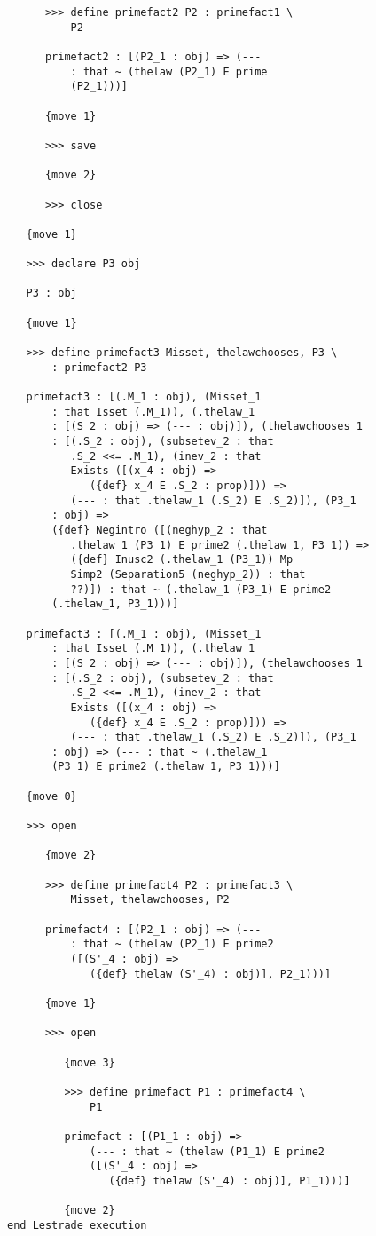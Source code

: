 \documentclass[12pt]{article}
\begin{document}
\begin{verbatim}
      >>> define primefact2 P2 : primefact1 \
          P2

      primefact2 : [(P2_1 : obj) => (--- 
          : that ~ (thelaw (P2_1) E prime 
          (P2_1)))]

      {move 1}

      >>> save

      {move 2}

      >>> close

   {move 1}

   >>> declare P3 obj

   P3 : obj

   {move 1}

   >>> define primefact3 Misset, thelawchooses, P3 \
       : primefact2 P3

   primefact3 : [(.M_1 : obj), (Misset_1 
       : that Isset (.M_1)), (.thelaw_1 
       : [(S_2 : obj) => (--- : obj)]), (thelawchooses_1 
       : [(.S_2 : obj), (subsetev_2 : that 
          .S_2 <<= .M_1), (inev_2 : that 
          Exists ([(x_4 : obj) => 
             ({def} x_4 E .S_2 : prop)])) => 
          (--- : that .thelaw_1 (.S_2) E .S_2)]), (P3_1 
       : obj) => 
       ({def} Negintro ([(neghyp_2 : that 
          .thelaw_1 (P3_1) E prime2 (.thelaw_1, P3_1)) => 
          ({def} Inusc2 (.thelaw_1 (P3_1)) Mp 
          Simp2 (Separation5 (neghyp_2)) : that 
          ??)]) : that ~ (.thelaw_1 (P3_1) E prime2 
       (.thelaw_1, P3_1)))]

   primefact3 : [(.M_1 : obj), (Misset_1 
       : that Isset (.M_1)), (.thelaw_1 
       : [(S_2 : obj) => (--- : obj)]), (thelawchooses_1 
       : [(.S_2 : obj), (subsetev_2 : that 
          .S_2 <<= .M_1), (inev_2 : that 
          Exists ([(x_4 : obj) => 
             ({def} x_4 E .S_2 : prop)])) => 
          (--- : that .thelaw_1 (.S_2) E .S_2)]), (P3_1 
       : obj) => (--- : that ~ (.thelaw_1 
       (P3_1) E prime2 (.thelaw_1, P3_1)))]

   {move 0}

   >>> open

      {move 2}

      >>> define primefact4 P2 : primefact3 \
          Misset, thelawchooses, P2

      primefact4 : [(P2_1 : obj) => (--- 
          : that ~ (thelaw (P2_1) E prime2 
          ([(S'_4 : obj) => 
             ({def} thelaw (S'_4) : obj)], P2_1)))]

      {move 1}

      >>> open

         {move 3}

         >>> define primefact P1 : primefact4 \
             P1

         primefact : [(P1_1 : obj) => 
             (--- : that ~ (thelaw (P1_1) E prime2 
             ([(S'_4 : obj) => 
                ({def} thelaw (S'_4) : obj)], P1_1)))]

         {move 2}
end Lestrade execution
\end{verbatim}
\end{document}
